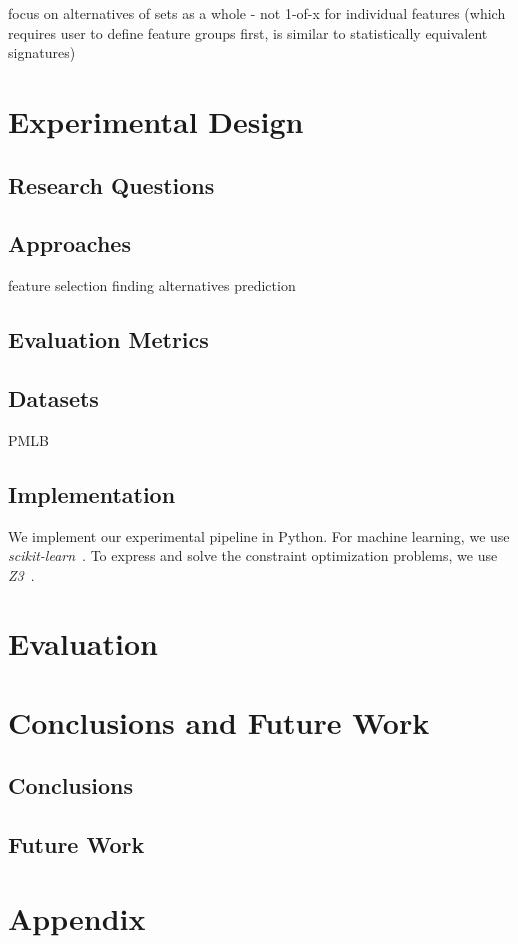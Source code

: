 \documentclass{article}
\theoremstyle{definition}
\begin{document}
focus on alternatives of sets as a whole - not 1-of-x for individual features (which requires user to define feature groups first, is similar to statistically equivalent signatures)

\section{Experimental Design}
\label{sec:experimental-design}

\subsection{Research Questions}

\subsection{Approaches}

feature selection
finding alternatives
prediction

\subsection{Evaluation Metrics}

\subsection{Datasets}

PMLB \cite{olson2017pmlb, romano2021pmlb}

\subsection{Implementation}

We implement our experimental pipeline in Python.
For machine learning, we use \emph{scikit-learn}~\cite{pedregosa2011scikit-learn}.
To express and solve the constraint optimization problems, we use \emph{Z3}~\cite{deMoura2008z3}.

\section{Evaluation}
\label{sec:evaluation}

\section{Conclusions and Future Work}
\label{sec:conclusion}

\subsection{Conclusions}

\subsection{Future Work}

\printbibliography

\appendix

\section{Appendix}
\label{sec:appendix}
\end{document}
